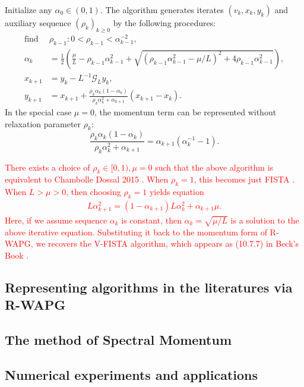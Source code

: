 \documentclass[12pt]{article}
\begin{document}
    \begin{definition}\label{def:r-wapg-momentum-form}
        Initialize any $\alpha_0 \in (0, 1)$. 
        The algorithm generates iterates $(v_k, x_k, y_k)$ and auxiliary sequence $(\rho_k)_{k \ge0}$ by the following procedures: 
        \begin{align*}
            \text{find }& \rho_{k - 1}: 0 < \rho_{k - 1} < \alpha_{k - 1}^{-2},
            \\
            \alpha_k &= 
            \frac{1}{2}\left(
            \frac{\mu}{L} - \rho_{k - 1}\alpha_{k - 1}^2 
            +
            \sqrt{(\rho_{k - 1}\alpha_{k - 1}^2 - \mu/L)^2 + 4\rho_{k - 1}\alpha_{k - 1}^2}
            \right), 
            \\
            x_{k + 1} &= y_k - L^{-1}\mathcal G_Ly_k, 
            \\
            y_{k + 1} &= 
            x_{k + 1} + 
            \frac{\rho_k\alpha_k(1 - \alpha_k)}{\rho_k\alpha_k^2 + \alpha_{k + 1}}(x_{k + 1} - x_k). 
        \end{align*}
        In the special case $\mu = 0$, the momentum term can be represented without relaxation parameter $\rho_k$: 
        $$
        \frac{\rho_k\alpha_k(1 - \alpha_k)}{\rho_k\alpha_k^2 + \alpha_{k + 1}} 
        = \alpha_{k + 1}(\alpha_k^{-1} - 1).  
        $$
        
    \end{definition}
    \begin{remark}
        \textcolor{red}
        {
        There exists a choice of $\rho_k \in [0, 1), \mu = 0$ such that the above algorithm is equivalent to Chambolle Dossal 2015 \cite{chambolle_convergence_2015}. 
        When $\rho_k = 1$, this becomes just FISTA \cite{beck_fast_2009}. 
        When $L > \mu > 0$, then choosing $\rho_k = 1$ yields equation 
        \begin{align*}
            L \alpha_{k + 1}^2 = (1- \alpha_{k + 1})L \alpha_k^2 + \alpha_{k + 1} \mu. 
        \end{align*}
        Here, if we assume sequence $\alpha_k$ is constant, then $\alpha_k = \sqrt{\mu/L}$ is a solution to the above iterative equation. 
        Substituting it back to the momentum form of R-WAPG, we recovers the V-FISTA algorithm, which appears as (10.7.7) in Beck's Book \cite{beck_first-order_2017}. 
        }
    \end{remark}

\subsection{Representing algorithms in the literatures via R-WAPG}
\subsection{The method of Spectral Momentum}
\subsection{Numerical experiments and applications}




\end{document}
